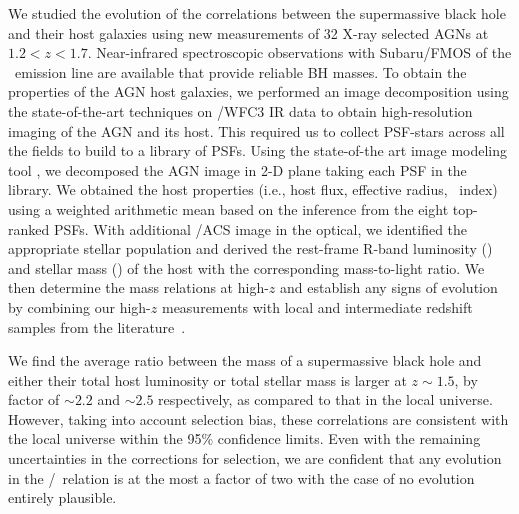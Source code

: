 \documentclass[apj]{emulateapj}
\begin{document}
We studied the evolution of the correlations between the supermassive black hole and their host galaxies using new measurements of 32 X-ray selected AGNs at $1.2<z<1.7$. Near-infrared spectroscopic observations with Subaru/FMOS of the \halpha\ emission line are available that provide reliable BH masses. To obtain the properties of the AGN host galaxies, we performed an image decomposition using the state-of-the-art techniques on \hst/WFC3 IR data to obtain high-resolution imaging of the AGN and its host. This required us to collect PSF-stars across all the fields to build to a library of PSFs. Using the state-of-the art image modeling tool \lenstronomy, we decomposed the AGN image in 2-D plane taking each PSF in the library. We obtained the host properties (i.e., host flux, effective radius, \sersic\ index) using a weighted arithmetic mean based on the inference from the eight top-ranked PSFs. With additional \hst/ACS image in the optical, we identified the appropriate stellar population and derived the rest-frame R-band luminosity (\lhost) and stellar mass (\smass) of the host with the corresponding mass-to-light ratio.
We then determine the mass relations at high-$z$ and establish any signs of evolution by combining our high-$z$ measurements with local and intermediate redshift samples from the literature~\citep{Park15, Bennert11, SS13, Cisternas2011}. 

We find the average ratio between the mass of a supermassive black hole and either their total host luminosity or total stellar mass is larger at $z\sim1.5$, by factor of $\sim2.2$ and $\sim2.5$ respectively, as compared to that in the local universe. However, taking into account selection bias, these correlations are
consistent with the local universe within the 95\% confidence limits. 
Even with the remaining uncertainties in the corrections for selection, we are confident that any evolution in the \mbh/\smass\ relation is at the most a factor of two with the case of no evolution entirely plausible.
\end{document}
